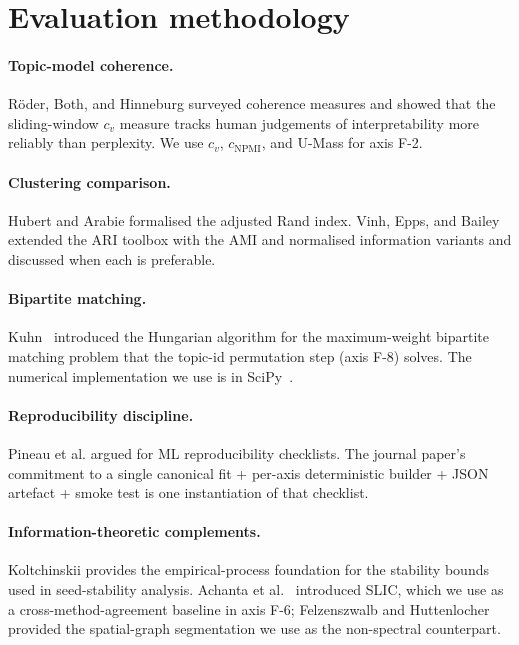 \documentclass[11pt,a4paper]{article}
\begin{document}
\section{Evaluation methodology}

\paragraph{Topic-model coherence.} Röder, Both, and Hinneburg
\cite{roder2015exploring} surveyed coherence measures and showed
that the sliding-window $c_v$ measure tracks human judgements of
interpretability more reliably than perplexity. We use $c_v$,
$c_{\text{NPMI}}$, and U-Mass for axis F-2.

\paragraph{Clustering comparison.} Hubert and Arabie
\cite{hubert1985ari} formalised the adjusted Rand index. Vinh,
Epps, and Bailey~\cite{vinh2010information} extended the ARI
toolbox with the AMI and normalised information variants and
discussed when each is preferable.

\paragraph{Bipartite matching.} Kuhn~\cite{kuhn1955hungarian}
introduced the Hungarian algorithm for the maximum-weight bipartite
matching problem that the topic-id permutation step (axis F-8)
solves. The numerical implementation we use is in
SciPy~\cite{virtanen2020scipy,scipy_assignment}.

\paragraph{Reproducibility discipline.} Pineau et al.
\cite{pineau2021nature} argued for ML reproducibility checklists.
The journal paper's commitment to a single canonical fit + per-axis
deterministic builder + JSON artefact + smoke test is one
instantiation of that checklist.

\paragraph{Information-theoretic complements.} Koltchinskii
\cite{koltchinskii2000empirical} provides the empirical-process
foundation for the stability bounds used in seed-stability
analysis. Achanta et al.~\cite{achanta2012slic} introduced SLIC,
which we use as a cross-method-agreement baseline in axis F-6;
Felzenszwalb and Huttenlocher~\cite{felzenszwalb2004efficient}
provided the spatial-graph segmentation we use as the
non-spectral counterpart.
\end{document}
